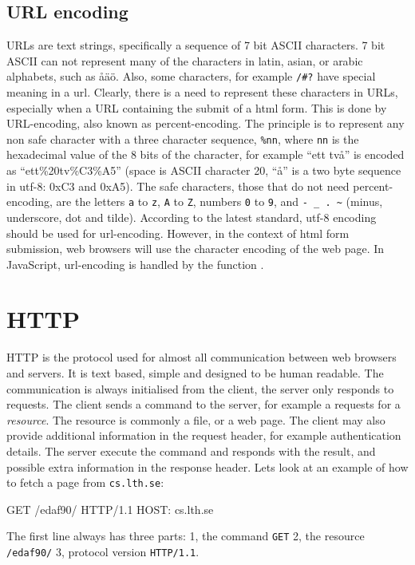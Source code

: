 \subsection{URL encoding} \label{section:url:encoding}
URLs are text strings, specifically a sequence of 7 bit ASCII characters. 7 bit ASCII can not represent many of the characters in latin, asian, or arabic alphabets, such as åäö. Also, some characters, for example \texttt{/\#?} have special meaning in a url. Clearly, there is a need to represent these characters in URLs, especially when a URL containing the submit of a html form. This is done by URL-encoding, also known as percent-encoding. The principle is to represent any non safe character with a three character sequence, \texttt{\%nn}, where \texttt{nn} is the hexadecimal value of the 8 bits of the character, for example  ``ett två'' is encoded as ``ett\%20tv\%C3\%A5'' (space is ASCII character 20, ``å'' is a two byte sequence in utf-8: 0xC3 and 0xA5). The safe characters, those that do not need percent-encoding, are the letters \texttt{a} to \texttt{z}, \texttt{A} to \texttt{Z}, numbers \texttt{0} to \texttt{9}, and \texttt{- \_ . \textasciitilde} (minus, underscore, dot and tilde). According to the latest standard, utf-8 encoding should be used for url-encoding. However, in the context of html form submission, web browsers will use the character encoding of the web page. In JavaScript, url-encoding is handled by the function .
	
\section{HTTP} \label{section:http}
HTTP is the protocol used for almost all communication between web browsers and servers. It is text based, simple and designed to be human readable. The communication is always initialised from the client, the server only responds to requests. The client sends a command to the server, for example a requests for a \emph{resource}. The resource is commonly a file, or a web page. The client may also provide additional information  in the request header, for example authentication details. The server execute the command and responds with the result, and possible extra information in the response header. Lets look at an example of how to fetch a page from \texttt{cs.lth.se}:
\begin{Code}
GET /edaf90/ HTTP/1.1
HOST: cs.lth.se

\end{Code}
The first line always has three parts: 1, the command \texttt{GET} 2, the resource \texttt{/edaf90/} 3, protocol version \texttt{HTTP/1.1}.

